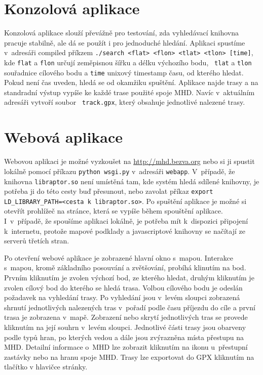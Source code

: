 \section{Konzolová aplikace}
Konzolová aplikace slouží převážně pro testování, zda vyhledávací knihovna
pracuje stabilně, ale dá se použít i pro jednoduché hledání. Aplikaci spustíme
v~adresáři compiled příkzem {\tt ./search <flat> <flon> <tlat> <tlon> [time]},
kde {\tt flat} a {\tt flon} určují zeměpisnou šířku a délku výchozího bodu, {\tt
tlat} a {\tt tlon} souřadnice cílového bodu a {\tt time} unixový timestamp času,
od kterého hledat. Pokud není čas uveden, hledá se od
okamžiku spuštění.  Aplikace najde trasy a na standradní výstup vypíše ke každé
trase použité spoje MHD. Navíc v~aktuálním adresáři vytvoří soubor {\tt
track.gpx}, který obsahuje jednotlivé nalezené trasy.
 
\section{Webová aplikace}
Webovou aplikaci je možné vyzkoušet na \url{http://mhd.bezva.org} nebo si ji spustit lokálně
pomocí příkazu {\tt python wsgi.py} v~adresáři {\tt webapp}. V~případě, že knihovna
{\tt libraptor.so} není umístěná tam, kde systém hledá sdílené knihovny, je potřeba ji
do této cesty buď přesunout, nebo zavolat příkaz {\tt export
LD\_LIBRARY\_PATH=<cesta k~libraptor.so>}. Po spuštění aplikace je možné si
otevřít prohlížeč na stránce, která se vypíše během spouštění aplikace.
I~v~případě, že spoušíme aplikaci lokálně, je potřeba mít k~dispozici připojení
k~internetu, protože mapové podklady a javascriptové knihovny se načítají ze
serverů třetích stran.

Po otevření webové aplikace je zobrazené hlavní okno s~mapou. Interakce s~mapou,
kromě základního posouvání a zvětšování, probíhá klinutím na bod. Prvním
kliknutím je zvolen výchozí bod, ze kterého hledat, druhým kliknutím je zvolen
cílový bod do kterého se hledá trasa. Volbou cílového bodu je odeslán požadavek
na vyhledání trasy. Po vyhledání jsou v~levém sloupci zobrazená shrnutí
jednotlivých nalezených tras v~pořadí podle času příjezdu do cíle a první trasa
je zobrazena v~mapě. Zobrazení nebo skrytí jednotlivých tras se provede
kliknutím na její souhrn v~levém sloupci. Jednotlivé části trasy jsou obarveny
podle typů hran, po kterých vedou a dále jsou zvýrazněna místa přestupu na MHD.
Detailní informace o~MHD lze zobrazit kliknutím na ikonu u~přestupní zastávky
nebo na hranu spoje MHD. Trasy lze exportovat do GPX kliknutím na tlačítko
 v hlavičce stránky.
